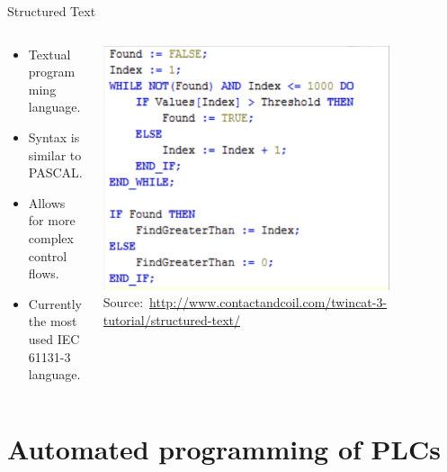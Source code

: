 \documentclass[18pt]{beamer}
\begin{document}
\begin{frame}[fragile]{Structured Text}
    \begin{columns}
        \begin{column}{0.5\textwidth}
           \begin{itemize}
               \item Textual programming language.
               \item Syntax is similar to PASCAL.
               \item Allows for more complex control flows.
               \item Currently the most used IEC 61131-3 language.
           \end{itemize}
        \end{column}
        \begin{column}{0.5\textwidth}
            \includegraphics[width=0.8\textwidth]{./figures/st.png}
            {\footnotesize Source:~\url{http://www.contactandcoil.com/twincat-3-tutorial/structured-text/}}
        \end{column}
\end{columns}
\end{frame}

\section{Automated programming of PLCs}
\end{document}
